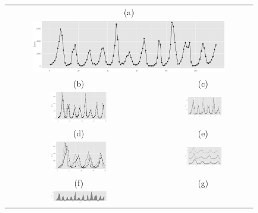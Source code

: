 \documentclass[12pt]{article}
\begin{document}
\begin{itemize}
\begin{center}
\begin{figure}[H]
\begin{centering}
\begin{tabular}{cc}
\multicolumn{2}{c}{\small{(a)}}\\
\multicolumn{2}{c}{\includegraphics[width=0.8\textwidth]{graph/pipeline-16-original}}\\
\small{(b)} & \small{(c)} \\
\includegraphics[width=0.4\textwidth]{graph/pipeline-16-1} &
\includegraphics[width=0.4\textwidth]{graph/pipeline-16-2} \\
\small{(d)} & \small{(e)} \\
\includegraphics[width=0.4\textwidth]{graph/pipeline-16-xwrap} &
\includegraphics[width=0.4\textwidth]{graph/pipeline-16-xwrap-facet} \\
\small{(f)} & \small{(g)} \\
\includegraphics[width=0.4\textwidth]{graph/pipeline-18-original} &

\end{tabular}
\end{centering}
\end{figure}
\end{center}
\end{itemize}
\end{document}

